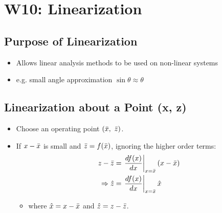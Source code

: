 \documentclass[a4paper]{article}
\begin{document}
\section{W10: Linearization}
\subsection{Purpose of Linearization}
\begin{itemize}
    \item Allows linear analysis methods to be used on non-linear systems
    \item e.g. small angle approximation $\sin\theta \approx \theta$
\end{itemize}

\subsection{Linearization about a Point (x, z)}
\begin{itemize}
    \item Choose an operating point $(\Bar{x},\ \Bar{z})$.
    \item If $x-\Bar{x}$ is small and $\Bar{z} = f(\Bar{x})$, ignoring the higher order terms:
    \begin{align*}
        z-\Bar{z} &= \left.\frac{df(x)}{dx}\right|_{x = \Bar{x}}(x-\Bar{x})\\
        \Rightarrow \hat{z} &= \left.\frac{df(x)}{dx}\right|_{x = \Bar{x}}\hat{x}
    \end{align*}
    \begin{itemize}[label=$\circ$]
        \item where $\hat{x} = x-\Bar{x}$ and $\hat{z} = z-\Bar{z}$.
    \end{itemize}
\end{itemize}
\end{document}
